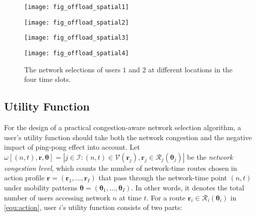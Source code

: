 \documentclass[journal]{IEEEtran}
\begin{document}



\begin{figure*}[t]
\centering
%
\begin{minipage}[t]{0.45\linewidth}
       \texttt{[image: fig\_offload\_spatial1]}
\end{minipage}
% 
\quad
%
\begin{minipage}[t]{0.45\linewidth}
       \texttt{[image: fig\_offload\_spatial2]}
\end{minipage}
%
\newline
%
\begin{minipage}[t]{0.45\linewidth}
       \texttt{[image: fig\_offload\_spatial3]}
\end{minipage}	
%
\quad
%
\begin{minipage}[t]{0.45\linewidth}
       \texttt{[image: fig\_offload\_spatial4]}
\end{minipage}
%
\vspace{-0.2cm}
\caption{The network selections of users $1$ and $2$ at different locations in the four time slots.}
\label{fig:spatial}
\end{figure*}	
	

\subsection{Utility Function} \label{sec:utility}

  For the design of a practical congestion-aware network selection algorithm, a user's utility function should take both the network congestion and the negative impact of ping-pong effect into account.
	Let $\omega[(n, t), \boldsymbol{r}, \boldsymbol{\theta}] = |j \in \mathcal{I}: (n,t) \in \mathcal{V}(\boldsymbol{r}_j), \boldsymbol{r}_j \in \mathcal{R}_j(\boldsymbol{\theta}_j)|$ be the \emph{network congestion level}, which counts the number of network-time routes chosen in action profile $\boldsymbol{r} = (\boldsymbol{r}_1,\dots,\boldsymbol{r}_I)$ that pass through the network-time point $(n, t)$  under mobility patterns $\boldsymbol{\theta} = (\boldsymbol{\theta}_1,\dots,\boldsymbol{\theta}_I)$. %
	In other words, it denotes the total number of users accessing network $n$ at time $t$.
	For a route $\boldsymbol{r}_i \in \mathcal{R}_i(\boldsymbol{\theta}_i)$ in \eqref{equ:action}, user $i$'s utility function consists of two parts: 
\end{document}
